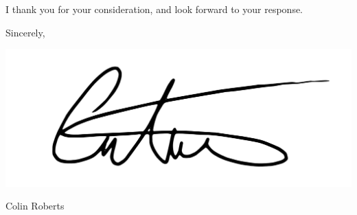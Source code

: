 \documentclass[12pt]{amsart}
\begin{document}
I thank you for your consideration, and look forward to your response.



\bigskip\bigskip

\qquad\qquad Sincerely,

\qquad\qquad\qquad\qquad \includegraphics[scale=0.2]{sig.png}

\vspace{-.1in}

\qquad\qquad\qquad\qquad\qquad Colin Roberts



\end{document}
